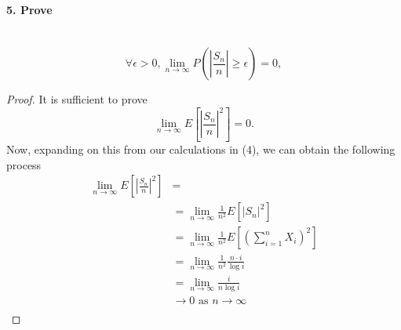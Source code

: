 \documentclass[11pt]{article}
\begin{document}
\paragraph{5. Prove } \text{}\\
\begin{equation*}
    \forall \epsilon > 0, \lim_{n \to \infty} P \left( \left|\frac{S_n}{n} \right| \ge \epsilon \right) = 0,
\end{equation*}
\begin{proof}
It is sufficient to prove
\begin{equation*}
    \lim_{n \to \infty} E \left[ \left| \frac{S_n}{n} \right|^2 \right] = 0.
\end{equation*}
Now, expanding on this from our calculations in (4), we can obtain the following process
\begin{align*}
    \lim_{n \to \infty} E \left[ \left| \frac{S_n}{n} \right|^2 \right] &= \\
      &= \lim_{n \to \infty} \frac{1}{n^2} E\left[ \left| S_n \right|^2 \right]  \\
     &= \lim_{n \to \infty} \frac{1}{n^2} E\left[ \left( \sum_{i=1}^{n} X_i \right)^2 \right ]\\
     &= \lim_{n \to \infty} \frac{1}{n^2} \frac{n \cdot i}{\log i} \\
     &= \lim_{n \to \infty} \frac{i}{n \log i} \\
     &\to 0 \text{ as } n \to \infty \\
\end{align*}
\end{proof}
\end{document}
